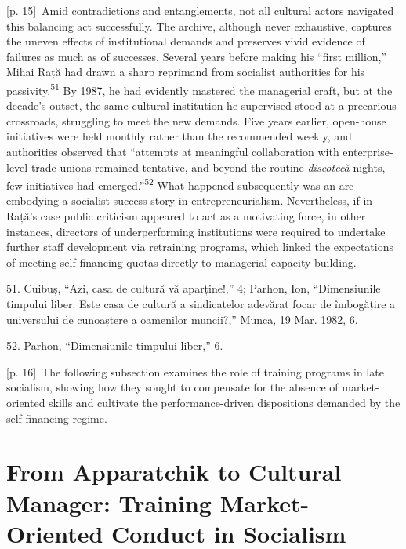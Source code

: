 \documentclass[10pt,a4paper]{article}
\begin{document}
{\scriptsize\color{gray} [p. 15]}\ Amid contradictions and entanglements, not all cultural actors navigated this balancing act successfully. The archive, although never exhaustive, captures the uneven effects of institutional demands and preserves vivid evidence of failures as much as of successes. Several years before making his “first million,” Mihai Rață had drawn a sharp reprimand from socialist authorities for his passivity.\nobreak\textsuperscript{51} By 1987, he had evidently mastered the managerial craft, but at the decade’s outset, the same cultural institution he supervised stood at a precarious crossroads, struggling to meet the new demands. Five years earlier, open-house initiatives were held monthly rather than the recommended weekly, and authorities observed that “attempts at meaningful collaboration with enterprise-level trade unions remained tentative, and beyond the routine \textit{discotecă} nights, few initiatives had emerged.”\nobreak\textsuperscript{52} What happened subsequently was an arc embodying a socialist success story in entrepreneurialism. Nevertheless, if in Rață’s case public criticism appeared to act as a motivating force, in other instances, directors of underperforming institutions were required to undertake further staff development via retraining programs, which linked the expectations of meeting self-financing quotas directly to managerial capacity building.\par{\small 51. Cuibuș, “Azi, casa de cultură vă aparține!,” 4; Parhon, Ion, “Dimensiunile timpului liber: Este casa de cultură a sindicatelor adevărat focar de îmbogățire a universului de cunoaștere a oamenilor muncii?,” Munca, 19 Mar. 1982, 6.\par}{\small 52. Parhon, “Dimensiunile timpului liber,” 6.\par}
{\scriptsize\color{gray} [p. 16]}\ The following subsection examines the role of training programs in late socialism, showing how they sought to compensate for the absence of market-oriented skills and cultivate the performance-driven dispositions demanded by the self-financing regime.\par
{}\section*{From Apparatchik to Cultural Manager: Training Market-Oriented Conduct in Socialism}
\end{document}
